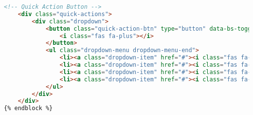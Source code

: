 \begin{lstlisting}[language=HTML]
    <!-- Quick Action Button -->
    <div class="quick-actions">
        <div class="dropdown">
            <button class="quick-action-btn" type="button" data-bs-toggle="dropdown" aria-expanded="false">
                <i class="fas fa-plus"></i>
            </button>
            <ul class="dropdown-menu dropdown-menu-end">
                <li><a class="dropdown-item" href="#"><i class="fas fa-exchange-alt me-2"></i> New Transfer</a></li>
                <li><a class="dropdown-item" href="#"><i class="fas fa-credit-card me-2"></i> Pay Bill</a></li>
                <li><a class="dropdown-item" href="#"><i class="fas fa-mobile-alt me-2"></i> Mobile Deposit</a></li>
                <li><a class="dropdown-item" href="#"><i class="fas fa-user-friends me-2"></i> Send to Friend</a></li>
            </ul>
        </div>
    </div>
{% endblock %}
\end{lstlisting}

